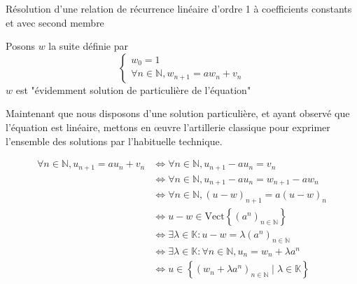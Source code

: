 \documentclass{article}
\date{16 décembre 2023}
\begin{document}
\maketitle

\begin{question_kholle}
	[Soient $a \in \K$ et $v \in \K^\N$ où \K peut être \C ou \R.
		L'ensemble des solutions de l'équation $\forall n \in \mathbb{N}, u_{n+1} = au_{n} + v_{n}$
		est la droite affine :
		\begin{equation}
			\left\{ w + \lambda \left( a^n \right) _{n \in \mathbb{N}} \mid \lambda \in \mathbb{K} \right\}
		\end{equation}
	]
	{Résolution d'une relation de récurrence linéaire d'ordre 1 à coefficients constants et avec second membre}

	Posons $w$ la suite définie par $$
		\left\{ \begin{array}{ll}
			w_{0} = 1 \\
			\forall n \in \mathbb{N}, w_{n+1} = aw_{n} + v_{n}
		\end{array}\right.
	$$
	$w$ est "évidemment solution de particulière de l'équation"

	Maintenant que nous disposons d'une solution particulière, et ayant observé que l'équation est linéaire, mettons en œuvre l'artillerie classique pour exprimer l'ensemble des solutions par l'habituelle technique.


	\begin{align*}
		\forall n \in \mathbb{N}, u_{n+1} = au_{n} + v_{n} & \iff \forall n \in \mathbb{N}, u_{n+1} - au_{n} = v_{n}                                                         \\
		                                                   & \iff \forall n \in \mathbb{N}, u_{n+1} - au_{n} = w_{n+1} - aw_{n}                                              \\
		                                                   & \iff \forall n \in \mathbb{N}, (u-w)_{n+1} = a(u-w)_{n}                                                         \\
		                                                   & \iff u-w \in \text{Vect}\left\{ \left( a^n \right) _{n \in \mathbb{N}} \right\}                                 \\
		                                                   & \iff \exists \lambda \in \mathbb{K} : u-w = \lambda \left( a^{n} \right) _{n \in \mathbb{N}}                    \\
		                                                   & \iff \exists \lambda \in \mathbb{K} : \forall n \in \mathbb{N}, u_{n} = w_{n} + \lambda a^n                     \\
		                                                   & \iff  u \in \left\{ \left( w_{n} + \lambda a^n \right) _{n \in \mathbb{N}} \mid \lambda \in \mathbb{K} \right\}
	\end{align*}

\end{question_kholle}
\end{document}
